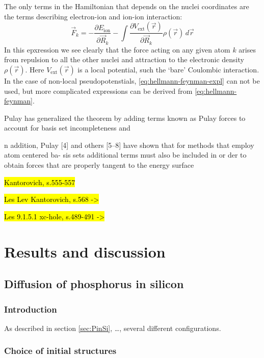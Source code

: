 \documentclass[11pt,bibliography=totoc,index=totoc]{scrbook}   %
\newcommand{\comment}[1]{\hl{#1}}
\begin{document}
The only terms in the Hamiltonian that depends on the nuclei coordinates are the terms describing
electron-ion and ion-ion interaction:
\begin{equation}
  \vec{F}_k = - \frac{\partial E_{\text{ion}}}{\partial\vec{R}_k} - \int \frac{\partial V_{\text{ext}}(\vec{r})}{\partial\vec{R}_k} \rho(\vec{r}) \,d\vec{r}
  \label{eq:hellmann-feynman-expl}
\end{equation}
In this epxression we see clearly that the force acting on any given atom $k$ arises from repulsion to all the other nuclei and attraction to the electronic density $\rho(\vec{r})$. Here $V_{\text{ext}}(\vec{r})$ is a local potential, such the `bare' Coulombic interaction. 
In the case of non-local pseudopotenstials, \eqref{eq:hellmann-feynman-expl} can not be used, but more complicated expressions can be derived from \eqref{eq:hellmann-feynman}.



Pulay\cite{Pulay:1969} has generalized the theorem by adding terms known as Pulay forces to account
for basis set incompleteness and 

n addition, Pulay [4] and others [5–8] have shown that for methods that employ atom centered ba- sis sets additional terms must also be included in or
der to obtain forces that are properly tangent to the energy surface


\comment{Kantorovich, s.555-557}

\comment{Les Lev Kantorovich, s.568 ->}

\comment{Les 9.1.5.1 xc-hole, s.489-491 ->}






\part{Results and discussion}

\chapter{Diffusion of phosphorus in silicon}

\section{Introduction}\label{sec:resultsIntro}

As described in section \ref{sec:PinSi}, \ldots, several different configurations.


\section{Choice of initial structures}\label{seq:initial-structures}
\end{document}
